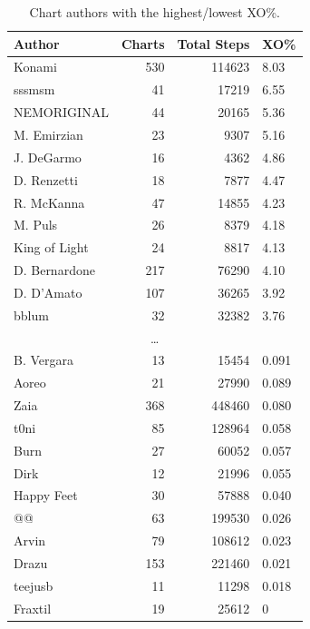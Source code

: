 \documentclass[10pt]{sigplanconf}
\begin{document}
\begin{table}[p]
	\begin{center}
		\small
	\begin{tabular}{l|r|r|l}
		\bf Author & \bf Charts & \bf Total Steps & \bf XO\% \\
		\hline
		Konami        & 530 & 114623 & 8.03 \\
		sssmsm        &  41 &  17219 & 6.55 \\
		NEMORIGINAL   &  44 &  20165 & 5.36 \\
		M. Emirzian   &  23 &   9307 & 5.16 \\
		J. DeGarmo    &  16 &   4362 & 4.86 \\
		D. Renzetti   &  18 &   7877 & 4.47 \\
		R. McKanna    &  47 &  14855 & 4.23 \\
		M. Puls       &  26 &   8379 & 4.18 \\
		King of Light &  24 &   8817 & 4.13 \\
		D. Bernardone & 217 &  76290 & 4.10 \\
		D. D'Amato    & 107 &  36265 & 3.92 \\
		bblum         &  32 &  32382 & 3.76 \\
		\multicolumn{4}{c}{\normalsize\dots} \\
		B. Vergara    &  13 &  15454 & 0.091 \\
		Aoreo         &  21 &  27990 & 0.089 \\
		Zaia          & 368 & 448460 & 0.080 \\
		t0ni          &  85 & 128964 & 0.058 \\
		Burn          &  27 &  60052 & 0.057 \\
		Dirk          &  12 &  21996 & 0.055 \\
		Happy Feet    &  30 &  57888 & 0.040 \\
		@@            &  63 & 199530 & 0.026 \\
		Arvin         &  79 & 108612 & 0.023 \\
		Drazu         & 153 & 221460 & 0.021 \\
		teejusb       &  11 &  11298 & 0.018 \\
		Fraxtil       &  19 &  25612 & 0 \\
	\end{tabular}
	\end{center}
	\caption{Chart authors with the highest/lowest XO\%.}
	\label{tab:author-xo}
\end{table}
\end{document}
